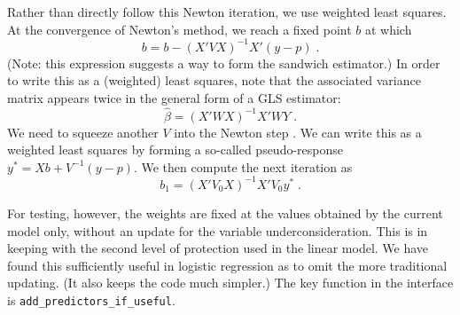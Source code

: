 \documentclass[12pt]{article}
\begin{document}
 Rather than directly follow this Newton iteration, we use weighted least
 squares.  At the convergence of Newton's method, we reach a fixed point $b$ at
 which
\begin{displaymath}
  b = b - (X'VX)^{-1}X'(y-p) \;.
\end{displaymath}
 (Note: this expression suggests a way to form the sandwich estimator.) In order
 to write this as a (weighted) least squares, note that the associated variance
 matrix appears twice in the general form of a GLS estimator:
\begin{displaymath}
  \hat\beta = (X'WX)^{-1}X'WY \;.
\end{displaymath}
 We need to squeeze another $V$ into the Newton step .  We can
 write this as a weighted least squares by forming a so-called pseudo-response
 $y^{*} = Xb + V^{-1}(y-p)$. We then compute the next iteration as
\begin{equation}
  b_1 = (X'V_0X)^{-1}X'V_0y^{*} \;.
\label{eq:irls}
\end{equation}

 For testing, however, the weights are fixed at the values obtained by the
 current model only, without an update for the variable underconsideration.
  This is in keeping with the second level of protection used in the linear
 model.  We have found this sufficiently useful in logistic regression as to
 omit the more traditional updating.  (It also keeps the code much simpler.)
  The key function in the interface is {\tt add\_predictors\_if\_useful}.
 
\end{document}
